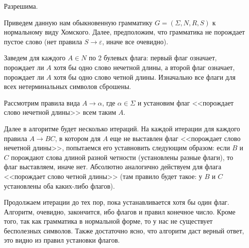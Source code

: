 \documentclass[russian,table]{article}
\begin{document}
Разрешима.

Приведем данную нам обыкновенную грамматику $G = (\Sigma,N,R,S)$ к нормальному виду Хомского. Далее, предположим, что грамматика не порождает пустое слово (нет правила $S \to \varepsilon$, иначе все очевидно).

Заведем для каждого $A \in N$ по 2 булевых флага: первый флаг означает, порождает ли $A$ хотя бы одно слово нечетной длины, а второй флаг означает, порождает ли $A$ хотя бы одно слово четной длины. Изначально все флаги для всех нетерминальных символов сброшены.

Рассмотрим правила вида $A \to \alpha$, где $\alpha \in \Sigma$ и установим флаг <<порождает слово нечетной длины>> всем таким $A$.

Далее в алгоритме будет несколько итераций. На каждой итерации для каждого правила $A \to BC$, в котором для $A$ еще не выставлен флаг <<порождает слово нечетной длины>>, попытаемся его уставновить следующим образом: если $B$ и $C$ порождают слова длиной разной четности (установлены разные флаги), то флаг выставляем, иначе нет. Абсолютно аналогично действуем для флага <<порождает слово четной длины>> (там правило будет такое: у $B$ и $C$ установлены оба каких-либо флагов).

Продолжаем итерации до тех пор, пока устанавливается хотя бы один флаг. Алгоритм, очевидно, закончится, ибо флагов и правил конечное число. Кроме того, так как грамматика в нормальной форме, то у нас не существует бесполезных символов.
Также достаточно ясно, что алгоритм даст верный ответ, это видно из правил установки флагов.
\end{document}
